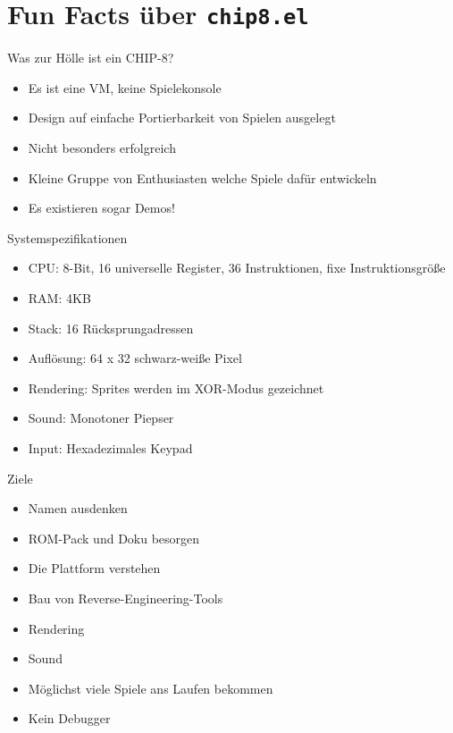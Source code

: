 \documentclass[presentation]{beamer}
\begin{document}
\section{Fun Facts über \texttt{chip8.el}}
\label{sec:orgfd6721a}

\begin{frame}[label={sec:org2ffa6ce}]{Was zur Hölle ist ein CHIP-8?}
\begin{itemize}
\item Es ist eine VM, keine Spielekonsole
\item Design auf einfache Portierbarkeit von Spielen ausgelegt
\item Nicht besonders erfolgreich
\item Kleine Gruppe von Enthusiasten welche Spiele dafür entwickeln
\item Es existieren sogar Demos!
\end{itemize}
\end{frame}

\begin{frame}[label={sec:org2a3f019}]{Systemspezifikationen}
\begin{itemize}
\item CPU: 8-Bit, 16 universelle Register, 36 Instruktionen, fixe Instruktionsgröße
\item RAM: 4KB
\item Stack: 16 Rücksprungadressen
\item Auflösung: 64 x 32 schwarz-weiße Pixel
\item Rendering: Sprites werden im XOR-Modus gezeichnet
\item Sound: Monotoner Piepser
\item Input: Hexadezimales Keypad
\end{itemize}
\end{frame}

\begin{frame}[label={sec:org1ab1500}]{Ziele}
\begin{itemize}
\item Namen ausdenken
\item ROM-Pack und Doku besorgen
\item Die Plattform verstehen
\item Bau von Reverse-Engineering-Tools
\item Rendering
\item Sound
\item Möglichst viele Spiele ans Laufen bekommen
\item Kein Debugger
\end{itemize}
\end{frame}
\end{document}
